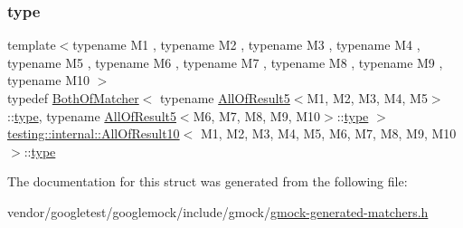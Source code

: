 \subsubsection{\texorpdfstring{type}{type}}
{\footnotesize\ttfamily template$<$typename M1 , typename M2 , typename M3 , typename M4 , typename M5 , typename M6 , typename M7 , typename M8 , typename M9 , typename M10 $>$ \\
typedef \hyperlink{classtesting_1_1internal_1_1_both_of_matcher}{Both\+Of\+Matcher}$<$ typename \hyperlink{structtesting_1_1internal_1_1_all_of_result5}{All\+Of\+Result5}$<$M1, M2, M3, M4, M5$>$\+::\hyperlink{structtesting_1_1internal_1_1_all_of_result10_a48d6c6de6d0d5445b212119e1f536af5}{type}, typename \hyperlink{structtesting_1_1internal_1_1_all_of_result5}{All\+Of\+Result5}$<$M6, M7, M8, M9, M10$>$\+::\hyperlink{structtesting_1_1internal_1_1_all_of_result10_a48d6c6de6d0d5445b212119e1f536af5}{type} $>$ \hyperlink{structtesting_1_1internal_1_1_all_of_result10}{testing\+::internal\+::\+All\+Of\+Result10}$<$ M1, M2, M3, M4, M5, M6, M7, M8, M9, M10 $>$\+::\hyperlink{structtesting_1_1internal_1_1_all_of_result10_a48d6c6de6d0d5445b212119e1f536af5}{type}}



The documentation for this struct was generated from the following file\+:\begin{DoxyCompactItemize}
\item 
vendor/googletest/googlemock/include/gmock/\hyperlink{gmock-generated-matchers_8h}{gmock-\/generated-\/matchers.\+h}\end{DoxyCompactItemize}
